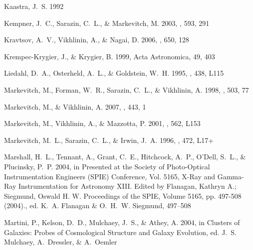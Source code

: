 \documentclass[12pt,preprint]{aastex}
\begin{document}
\begin{thebibliography}{}
{Kaastra}, J.~S. 1992

{Kempner}, J.~C., {Sarazin}, C.~L., \& {Markevitch}, M. 2003, \apj, 593, 291

{Kravtsov}, A.~V., {Vikhlinin}, A., \& {Nagai}, D. 2006, \apj, 650, 128

{Krempec-Krygier}, J., \& {Krygier}, B. 1999, Acta Astronomica, 49, 403

{Liedahl}, D.~A., {Osterheld}, A.~L., \& {Goldstein}, W.~H. 1995, \apjl, 438,
  L115

{Markevitch}, M., {Forman}, W.~R., {Sarazin}, C.~L., \& {Vikhlinin}, A. 1998,
  \apj, 503, 77

{Markevitch}, M., \& {Vikhlinin}, A. 2007, \physrep, 443, 1

{Markevitch}, M., {Vikhlinin}, A., \& {Mazzotta}, P. 2001, \apjl, 562, L153

{Markevitch}, M.~L., {Sarazin}, C.~L., \& {Irwin}, J.~A. 1996, \apjl, 472, L17+

{Marshall}, H.~L., {Tennant}, A., {Grant}, C.~E., {Hitchcock}, A.~P., {O'Dell},
  S.~L., \& {Plucinsky}, P.~P. 2004, in Presented at the Society of
  Photo-Optical Instrumentation Engineers (SPIE) Conference, Vol. 5165, X-Ray
  and Gamma-Ray Instrumentation for Astronomy XIII. Edited by Flanagan, Kathryn
  A.; Siegmund, Oswald H. W. Proceedings of the SPIE, Volume 5165, pp. 497-508
  (2004)., ed. K.~A. {Flanagan} \& O.~H.~W. {Siegmund}, 497--508

{Martini}, P., {Kelson}, D.~D., {Mulchaey}, J.~S., \& {Athey}, A. 2004, in
  Clusters of Galaxies: Probes of Cosmological Structure and Galaxy Evolution,
  ed. J.~S. {Mulchaey}, A.~{Dressler}, \& A.~{Oemler}


\end{thebibliography}
\end{document}
